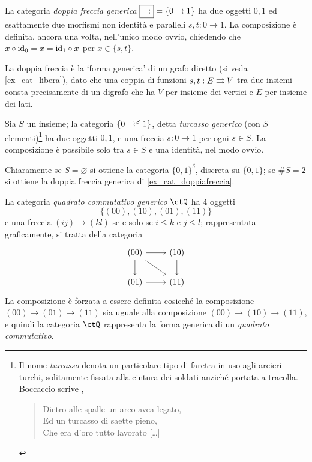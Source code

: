 \begin{example}\label{ex_cat_doppiafreccia}
	La categoria \emph{doppia freccia generica} \(\boxed{\rightrightarrows}=\{0\rightrightarrows 1\}\) ha due oggetti \(0,1\) ed esattamente due morfismi non identità e paralleli \(s,t : 0\to 1\). La composizione è definita, ancora una volta, nell'unico modo ovvio, chiedendo che \(x\circ \mathrm{id}_0=x=\mathrm{id}_1\circ x\) per \(x\in\{s,t\}\).

	La doppia freccia è la `forma generica' di un grafo diretto (si veda \ref{ex_cat_libera}), dato che una coppia di funzioni \(s,t: E \rightrightarrows V\) tra due insiemi consta precisamente di un digrafo che ha \(V\) per insieme dei vertici e \(E\) per insieme dei lati.
\end{example}
\begin{example}\label{ex_cat_turcasso}
	Sia \(S\) un insieme; la categoria \(\turk\), detta \emph{turcasso generico} (con \(S\) elementi)\footnote{Il nome \emph{turcasso} denota un particolare tipo di faretra in uso agli arcieri turchi, solitamente fissata alla cintura dei soldati anziché portata a tracolla. Boccaccio scrive \cite{boccaccio1831teseide},
		\begin{verse}
			Dietro alle spalle un arco avea legato,\\
			Ed un turcasso di saette pieno,\\
			Che era d'oro tutto lavorato [\dots\unkern]
		\end{verse}} ha due oggetti \(0,1\), e una freccia \(s : 0\to 1\) per ogni \(s\in S\). La composizione è possibile solo tra \(s\in S\) e una identità, nel modo ovvio.

	Chiaramente se \(S=\varnothing\) si ottiene la categoria \(\{0,1\}^\delta\), discreta su \(\{0,1\}\); se \(\#S=2\) si ottiene la doppia freccia generica di \ref{ex_cat_doppiafreccia}.
\end{example}
\begin{example}\label{ex_quadcuboncubo}
	La categoria \emph{quadrato commutativo generico} \(\ctQ\) ha 4 oggetti
	\[\{(00),(10),(01),(11)\} \]
	e una freccia \((ij)\to(kl)\) se e solo se \(i\le k\) e \(j\le l\); rappresentata graficamente, si tratta della categoria
	\[\begin{tikzcd}
			(00) \ar[r]\ar[d]\ar[dr]& (10)\ar[d] \\
			(01) \ar[r]& (11)
		\end{tikzcd}\]
	La composizione è forzata a essere definita cosicché la composizione \((00)\to (01)\to (11)\) sia uguale alla composizione \((00)\to (10)\to (11)\), e quindi la categoria \(\ctQ\) rappresenta la forma generica di un \emph{quadrato commutativo}.
\end{example}
